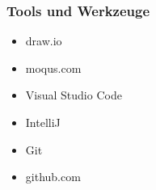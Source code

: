     \subsubsection*{Tools und Werkzeuge}

        \begin{itemize}
            \item draw.io
            \item moqus.com
            \item Visual Studio Code
            \item IntelliJ
            \item Git
            \item github.com 
        \end{itemize}
